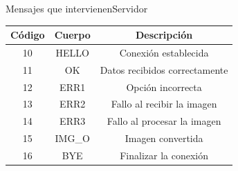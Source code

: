\documentclass[spanish]{beamer}
\begin{document}
\begin{frame}{Mensajes que intervienen}{Servidor}
\begin{center}
	\begin{tabular}{|c|c|c|}
	\hline
	Código & Cuerpo & Descripción\\
	\hline
	10 & HELLO & Conexión establecida\\
	\hline
	11 & OK & Datos recibidos correctamente\\
	\hline
	12 & ERR1 & Opción incorrecta\\
	\hline
	13 & ERR2 & Fallo al recibir la imagen\\
	\hline
	14 & ERR3 & Fallo al procesar la imagen\\
	\hline
	15 & IMG\_O & Imagen convertida\\
	\hline
	16 & BYE & Finalizar la conexión\\
	\hline 
\end{tabular}	
\end{center}
\end{frame}
\end{document}
